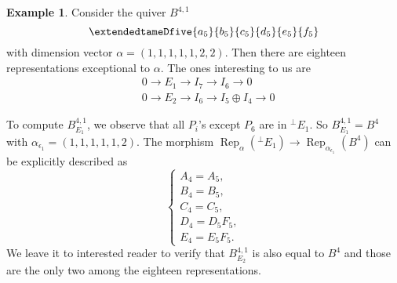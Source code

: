 \documentclass{amsart}
\theoremstyle{definition}
\newtheorem{example}[theorem]{Example}
\theoremstyle{remark}
\numberwithin{equation}{section}
\begin{document}
\begin{example} \label{Ex:2}
Consider the quiver $B^{4,1}$
$$\extendedtameDfive{a_5}{b_5}{c_5}{d_5}{e_5}{f_5}$$ with dimension vector $\alpha=(1,1,1,1,1,2,2)$. Then there are eighteen representations exceptional to $\alpha$. The ones interesting to us are \begin{align*}
& 0\to E_1\to I_7\to I_6\to 0\\
& 0\to E_2\to I_6\to I_5\oplus I_4\to 0
\end{align*}

To compute $B^{4,1}_{E_1}$, we observe that all $P_i$'s except $P_6$ are in ${{^\perp}\!} E_1$.
So $B^{4,1}_{E_1}=B^4$ with $\alpha_{\epsilon_1}=(1,1,1,1,1,2)$. The morphism ${\operatorname{Rep}}_\alpha({{^\perp}\!} E_1)\to{\operatorname{Rep}}_{\alpha_{\epsilon_1}}(B^4)$ can be explicitly described as $$\begin{cases}
A_4=A_5,\\
B_4=B_5,\\
C_4=C_5,\\
D_4=D_5F_5,\\
E_4=E_5F_5.\end{cases}$$
We leave it to interested reader to verify that $B^{4,1}_{E_2}$ is also equal to $B^4$ and those are the only two among the eighteen representations.
\end{example}
\end{document}

